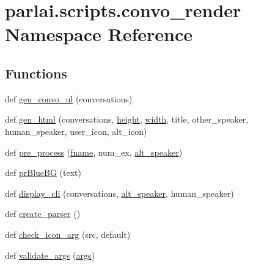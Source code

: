 \hypertarget{namespaceparlai_1_1scripts_1_1convo__render}{}\section{parlai.\+scripts.\+convo\+\_\+render Namespace Reference}
\label{namespaceparlai_1_1scripts_1_1convo__render}
\subsection*{Functions}
\begin{DoxyCompactItemize}
\item 
def \hyperlink{namespaceparlai_1_1scripts_1_1convo__render_a8c393321c36d1cafceb86aa3f7431c4c}{gen\+\_\+convo\+\_\+ul} (conversations)
\item 
def \hyperlink{namespaceparlai_1_1scripts_1_1convo__render_ad23695f4d64e7dbd1fee801098d570b2}{gen\+\_\+html} (conversations, \hyperlink{namespaceparlai_1_1scripts_1_1convo__render_a3ea95c859b230a646a5c6fe5b4586b67}{height}, \hyperlink{namespaceparlai_1_1scripts_1_1convo__render_a9781c43527eb370030ea6f1cafca6a3a}{width}, title, other\+\_\+speaker, human\+\_\+speaker, user\+\_\+icon, alt\+\_\+icon)
\item 
def \hyperlink{namespaceparlai_1_1scripts_1_1convo__render_a0f0a031443ca797c936d2961a702a45e}{pre\+\_\+process} (\hyperlink{namespaceparlai_1_1scripts_1_1convo__render_afdeec635d90f882f6f9c117a9cf62010}{fname}, num\+\_\+ex, \hyperlink{namespaceparlai_1_1scripts_1_1convo__render_a516a38b04ed5b7cf0c03ed2ea0e99d46}{alt\+\_\+speaker})
\item 
def \hyperlink{namespaceparlai_1_1scripts_1_1convo__render_a21a7681b9803eb6994ac72c7d480cb94}{pr\+Blue\+BG} (text)
\item 
def \hyperlink{namespaceparlai_1_1scripts_1_1convo__render_a68e7e186a59ac2397560d0107f804ff3}{display\+\_\+cli} (conversations, \hyperlink{namespaceparlai_1_1scripts_1_1convo__render_a516a38b04ed5b7cf0c03ed2ea0e99d46}{alt\+\_\+speaker}, human\+\_\+speaker)
\item 
def \hyperlink{namespaceparlai_1_1scripts_1_1convo__render_a4220e40f3e0c5ac320177b6e0f3d8e83}{create\+\_\+parser} ()
\item 
def \hyperlink{namespaceparlai_1_1scripts_1_1convo__render_ac7e3c84a7f6e3b488360319b597eda18}{check\+\_\+icon\+\_\+arg} (src, default)
\item 
def \hyperlink{namespaceparlai_1_1scripts_1_1convo__render_a4078a037f4f5526297e7860fbed9cfb2}{validate\+\_\+args} (\hyperlink{namespaceparlai_1_1scripts_1_1convo__render_a9db4d889d4ee08e848b2c0526120483b}{args})
\end{DoxyCompactItemize}
